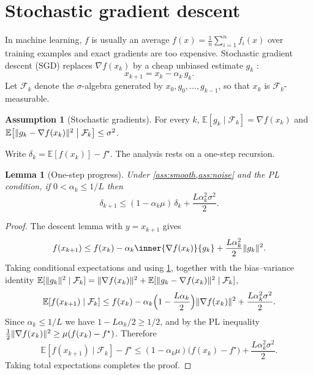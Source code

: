 \documentclass[11pt,a4paper,oneside]{report}
\theoremstyle{plain}
\newtheorem{lemma}[theorem]{Lemma}
\theoremstyle{definition}
\newtheorem{assumption}[theorem]{Assumption}
\theoremstyle{remark}
\newcommand{\E}{\mathbb{E}}
\DeclarePairedDelimiter{\norm}{\lVert}{\rVert}
\begin{document}
\section{Stochastic gradient descent}
\label{sec:pl-sgd}

In machine learning, $f$ is usually an average $f(x) = \frac1n\sum_{i=1}^n f_i(x)$ over training examples and exact gradients are too expensive. Stochastic gradient descent (SGD) replaces $\nabla f(x_k)$ by a cheap unbiased estimate $g_k$ \citep{robbins1951,bottou2018}:
\begin{equation}\label{eq:sgd}
  x_{k+1} = x_k - \alpha_k\,g_k.
\end{equation}
Let $\mathcal{F}_k$ denote the $\sigma$-algebra generated by $x_0, g_0, \dots, g_{k-1}$, so that $x_k$ is $\mathcal{F}_k$-measurable.

\begin{assumption}[Stochastic gradients]\label{ass:noise}
For every $k$, $\E[g_k\mid\mathcal{F}_k] = \nabla f(x_k)$ and $\E\bigl[\norm{g_k - \nabla f(x_k)}^2\bigm|\mathcal{F}_k\bigr] \le \sigma^2$.
\end{assumption}

Write $\delta_k = \E[f(x_k)] - f^\star$. The analysis rests on a one-step recursion.

\begin{lemma}[One-step progress]\label{lem:sgd-step}
Under \cref{ass:smooth,ass:noise} and the PL condition, if $0 < \alpha_k \le 1/L$ then
\begin{equation}\label{eq:sgd-recursion}
  \delta_{k+1} \le (1 - \alpha_k\mu)\,\delta_k + \frac{L\alpha_k^2\sigma^2}{2}.
\end{equation}
\end{lemma}

\begin{proof}
The descent lemma with $y = x_{k+1}$ gives
\[
  f(x_{k+1}) \le f(x_k) - \alpha_k\inner{\nabla f(x_k)}{g_k} + \frac{L\alpha_k^2}{2}\norm{g_k}^2.
\]
Taking conditional expectations and using \cref{ass:noise}, together with the bias--variance identity $\E[\norm{g_k}^2\mid\mathcal{F}_k] = \norm{\nabla f(x_k)}^2 + \E[\norm{g_k - \nabla f(x_k)}^2\mid\mathcal{F}_k]$,
\[
  \E[f(x_{k+1})\mid\mathcal{F}_k] \le f(x_k) - \alpha_k\Bigl(1 - \frac{L\alpha_k}{2}\Bigr)\norm{\nabla f(x_k)}^2 + \frac{L\alpha_k^2\sigma^2}{2}.
\]
Since $\alpha_k\le1/L$ we have $1 - L\alpha_k/2 \ge 1/2$, and by the PL inequality $\frac12\norm{\nabla f(x_k)}^2\ge\mu(f(x_k) - f^\star)$. Therefore
\[
  \E[f(x_{k+1})\mid\mathcal{F}_k] - f^\star \le (1 - \alpha_k\mu)\bigl(f(x_k) - f^\star\bigr) + \frac{L\alpha_k^2\sigma^2}{2}.
\]
Taking total expectations completes the proof.
\end{proof}
\end{document}
